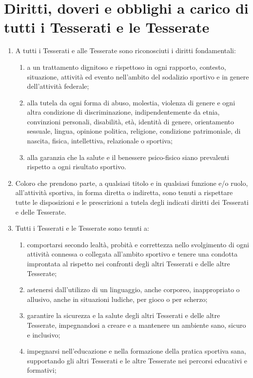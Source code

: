 \documentclass{djtsasddoc}
\begin{document}
	\section{Diritti, doveri e obblighi a carico di tutti i Tesserati e le Tesserate}
	\begin{enumerate}
		\item A tutti i Tesserati e alle Tesserate sono riconosciuti i diritti fondamentali:
		\begin{enumerate}
			\item a un trattamento dignitoso e rispettoso in ogni rapporto, contesto, situazione, attività ed evento nell'ambito del sodalizio sportivo e in genere dell'attività federale;
			\item alla tutela da ogni forma di abuso, molestia, violenza di genere e ogni altra condizione di	discriminazione, indipendentemente da etnia, convinzioni personali, disabilità, età, identità di	genere, orientamento sessuale, lingua, opinione politica, religione, condizione patrimoniale, di 	nascita, fisica, intellettiva, relazionale o sportiva;
			\item alla garanzia che la salute e il benessere psico-fisico siano prevalenti rispetto a ogni risultato sportivo.
		\end{enumerate}
		\item Coloro che prendono parte, a qualsiasi titolo e in qualsiasi funzione e/o ruolo, all'attività sportiva, in forma diretta o indiretta, sono tenuti a rispettare tutte le disposizioni e le prescrizioni a tutela degli indicati diritti dei Tesserati e delle Tesserate.
		\item Tutti i Tesserati e le Tesserate sono tenuti a:
		\begin{enumerate}
			\item comportarsi secondo lealtà, probità e correttezza nello svolgimento di ogni attività connessa o	collegata all'ambito sportivo e tenere una condotta improntata al rispetto nei confronti degli	altri Tesserati e delle altre Tesserate;
			\item astenersi dall'utilizzo di un linguaggio, anche corporeo, inappropriato o allusivo, anche in	situazioni ludiche, per gioco o per scherzo;
			\item garantire la sicurezza e la salute degli altri Tesserati e delle altre Tesserate, impegnandosi a	creare e a mantenere un ambiente sano, sicuro e inclusivo;
			\item impegnarsi nell'educazione e nella formazione della pratica sportiva sana, supportando gli 	altri Tesserati e le altre Tesserate nei percorsi educativi e formativi;

\end{enumerate}
\end{enumerate}
\end{document}
